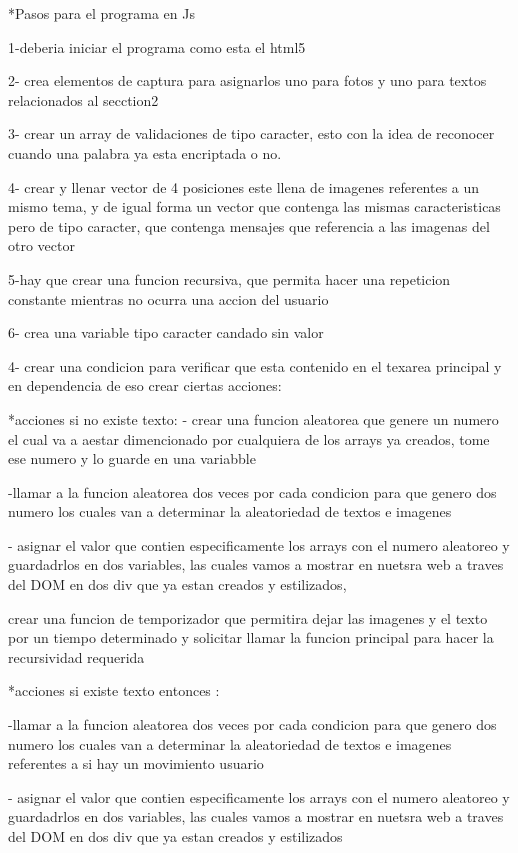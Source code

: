   *Pasos para el programa en Js

  1-deberia iniciar el programa como esta el html5

  2- crea elementos de captura para asignarlos uno para fotos y uno para textos relacionados al secction2

  3- crear un array de validaciones de tipo caracter, esto con la idea de reconocer cuando una palabra ya esta encriptada o no.

  4- crear y llenar vector de 4 posiciones  este llena de imagenes referentes a un mismo tema, y de igual 
  forma un vector que contenga las mismas caracteristicas pero de tipo caracter, que contenga mensajes que 
  referencia a las imagenas del otro vector 
  
  5-hay que crear una funcion recursiva, que permita hacer una repeticion constante mientras no ocurra una accion del usuario
  
  6- crea una variable tipo caracter candado sin valor
 
  4- crear una condicion para verificar que esta contenido en el texarea principal y en dependencia de eso crear ciertas acciones:
    
      *acciones si no existe texto:
         - crear una funcion aleatorea que genere un numero el cual va a aestar dimencionado por cualquiera de los arrays ya creados, tome ese numero 
         y lo guarde en una variabble

         -llamar a la funcion aleatorea dos veces por cada condicion para que genero dos numero los cuales van a determinar la aleatoriedad de textos e imagenes

         - asignar el valor que contien especificamente los arrays con el numero aleatoreo y guardadrlos en dos variables, las cuales vamos a mostrar en nuetsra 
         web a traves del DOM en dos div que ya estan creados y estilizados,

         crear una funcion de temporizador que permitira dejar las imagenes y el texto por un tiempo determinado y solicitar llamar la funcion principal para hacer la recursividad requerida

      *acciones si existe texto entonces :

        -llamar a la funcion aleatorea dos veces por cada condicion para que genero dos numero los cuales van a determinar la aleatoriedad de textos e imagenes referentes a si hay un movimiento usuario 

        - asignar el valor que contien especificamente los arrays con el numero aleatoreo y guardadrlos en dos variables, las cuales vamos a mostrar en nuetsra 
        web a traves del DOM en dos div que ya estan creados y estilizados

